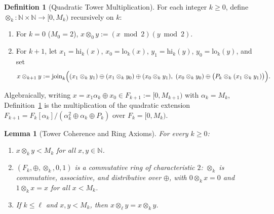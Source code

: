 \documentclass[11pt]{article}
\newtheorem{lemma}[theorem]{Lemma}
\theoremstyle{definition}
\newtheorem{definition}[theorem]{Definition}
\theoremstyle{remark}
\newcommand{\nimadd}{\oplus}
\newcommand{\nimmul}{\otimes}
\newcommand{\N}{\mathbb{N}}
\begin{document}
\begin{definition}[Quadratic Tower Multiplication]\label{def:nimMulK}
For each integer $k \ge 0$, define $\nimmul_k : \N \times \N \to [0, M_k)$ recursively on $k$:
\begin{enumerate}
  \item For $k = 0$ ($M_0 = 2$), $x \nimmul_0 y := (x \bmod 2)(y \bmod 2)$.
  \item For $k + 1$, let $x_1 = \mathrm{hi}_k(x)$, $x_0 = \mathrm{lo}_k(x)$, $y_1 = \mathrm{hi}_k(y)$, $y_0 = \mathrm{lo}_k(y)$, and set
  \[
    x \nimmul_{k+1} y := \mathrm{join}_k\Bigl((x_1 \nimmul_k y_1) \nimadd (x_1 \nimmul_k y_0) \nimadd (x_0 \nimmul_k y_1),\;
    (x_0 \nimmul_k y_0) \nimadd \bigl(P_k \nimmul_k (x_1 \nimmul_k y_1)\bigr)\Bigr).
  \]
\end{enumerate}
\end{definition}

Algebraically, writing $x = x_1 \alpha_k \nimadd x_0 \in F_{k+1} := [0, M_{k+1})$ with $\alpha_k = M_k$, Definition~\ref{def:nimMulK} is the multiplication of the quadratic extension $F_{k+1} = F_k[\alpha_k] / (\alpha_k^2 \nimadd \alpha_k \nimadd P_k)$ over $F_k = [0, M_k)$.

\begin{lemma}[Tower Coherence and Ring Axioms]\label{lem:ring-tower}
For every $k \ge 0$:
\begin{enumerate}
  \item $x \nimmul_k y < M_k$ for all $x, y \in \N$.
  \item $(F_k, \nimadd, \nimmul_k, 0, 1)$ is a commutative ring of characteristic $2$: $\nimmul_k$ is commutative, associative, and distributive over $\nimadd$, with $0 \nimmul_k x = 0$ and $1 \nimmul_k x = x$ for all $x < M_k$.
  \item If $k \le \ell$ and $x, y < M_k$, then $x \nimmul_\ell y = x \nimmul_k y$.
\end{enumerate}
\end{lemma}
\end{document}
